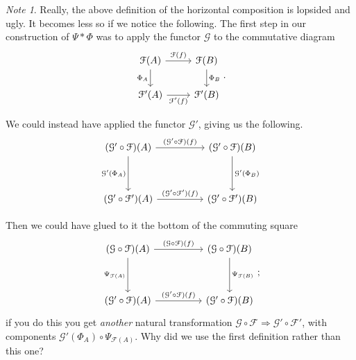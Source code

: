 \documentclass[a4paper]{report}
\theoremstyle{definition}
\theoremstyle{plain}
\theoremstyle{remark}
\newtheorem{note}{Note}[section]
\begin{document}
\begin{note}
  Really, the above definition of the horizontal composition is lopsided and ugly. It becomes less so if we notice the following. The first step in our construction of $\Psi * \Phi$ was to apply the functor $\mathcal{G}$ to the commutative diagram
  \begin{equation*}
    \begin{tikzcd}
      \mathcal{F}(A)
      \arrow[d, swap, "\Phi_{A}"] 
      \arrow[r, "\mathcal{F}(f)"] 
      & \mathcal{F}(B)
      \arrow[d, "\Phi_{B}"] 
      \\
      \mathcal{F}'(A) 
      \arrow[r, swap, "\mathcal{F}'(f)"] 
      & \mathcal{F}'(B) 
    \end{tikzcd}.
  \end{equation*}

  We could instead have applied the functor $\mathcal{G}'$, giving us the following.
  \begin{equation*}
    \begin{tikzcd}[row sep=huge, column sep=huge]
      (\mathcal{G}' \circ \mathcal{F})(A)
      \arrow[d, swap, "\mathcal{G}'(\Phi_{A})"] 
      \arrow[r, "(\mathcal{G}' \circ \mathcal{F})(f)"] 
      & (\mathcal{G}' \circ \mathcal{F})(B)
      \arrow[d, "\mathcal{G}'(\Phi_{B})"] 
      \\
      (\mathcal{G}' \circ \mathcal{F}')(A) 
      \arrow[r, "(\mathcal{G}' \circ \mathcal{F}')(f)"] 
      & (\mathcal{G}' \circ \mathcal{F}')(B) 
    \end{tikzcd}
  \end{equation*}

  Then we could have glued to it the bottom of the commuting square
  \begin{equation*}
    \begin{tikzcd}[row sep=huge, column sep=huge]
      (\mathcal{G} \circ \mathcal{F})(A)
      \arrow[r, "(\mathcal{G} \circ \mathcal{F})(f)"]
      \arrow[d, swap, "\Psi_{\mathcal{F}(A)}"]
      & (\mathcal{G} \circ \mathcal{F})(B)
      \arrow[d, "\Psi_{\mathcal{F}(B)}"]
      \\
      (\mathcal{G}' \circ \mathcal{F})(A)
      \arrow[r, "(\mathcal{G}' \circ \mathcal{F})(f)"]
      & (\mathcal{G}' \circ \mathcal{F})(B)
    \end{tikzcd};
  \end{equation*}
  if you do this you get \emph{another} natural transformation $\mathcal{G} \circ \mathcal{F} \Rightarrow \mathcal{G}' \circ \mathcal{F}'$, with components $\mathcal{G}'(\Phi_{A}) \circ \Psi_{\mathcal{F}(A)}$. Why did we use the first definition rather than this one? 


\end{note}
\end{document}
